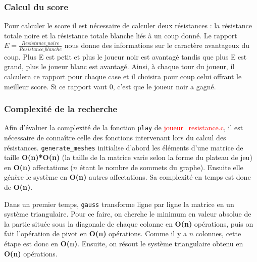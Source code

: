 \documentclass{article}
\begin{document}
\subsubsection{Calcul du score}
Pour calculer le score il est nécessaire de calculer deux résistances : la résistance totale noire et la résistance totale blanche liés à un coup donné. Le rapport $E=\frac{Resistance\_noire}{Resistance\_blanche}$ nous donne des informations sur le caractère avantageux du coup. Plus E est petit et plus le joueur noir est avantagé tandis que plus E est grand, plus le joueur blanc est avantagé. Ainsi, à chaque tour du joueur, il calculera ce rapport pour chaque case et il choisira pour coup celui offrant le meilleur score. Si ce rapport vaut 0, c'est que le joueur noir a gagné. 


\subsubsection{Complexité de la recherche} 
Afin d'évaluer la complexité de la fonction \lstinline{play} de \textcolor{red}{joueur\_resistance.c}, il est nécessaire de connaître celle des fonctions intervenant lors du calcul des résistances.
 \lstinline{generate_meshes} initialise d'abord les éléments d'une matrice de taille \textbf{O(n)*O(n)} (la taille de la matrice varie selon la forme du plateau de jeu) en \textbf{O(n)} affectations ($n$ étant le nombre de sommets du graphe). Ensuite elle génère le système en \textbf{O(n)} autres affectations. Sa complexité en temps est donc de \textbf{O(n)}.
 
 Dans un premier temps, \lstinline{gauss} transforme ligne par ligne la matrice en un système triangulaire. Pour ce faire, on cherche le minimum en valeur absolue de la partie située sous la diagonale de chaque colonne en \textbf{O(n)} opérations, puis on fait l'opération de pivot en \textbf{O(n)} opérations. Comme il y a $n$ colonnes, cette étape est donc en \textbf{O(n)}. Ensuite, on résout le système triangulaire obtenu en \textbf{O(n)} opérations.
 
\end{document}
